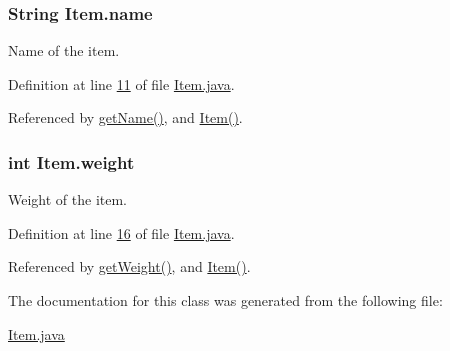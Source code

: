 \hypertarget{classItem_a42fd6d4796fcf652806278f65ce93a3b}{
\subsubsection[{name}]{\setlength{\rightskip}{0pt plus 5cm}String Item.\-name\hspace{0.3cm}{\ttfamily [private]}}}\label{classItem_a42fd6d4796fcf652806278f65ce93a3b}


Name of the item. 



Definition at line \hyperlink{Item_8java_source_l00011}{11} of file \hyperlink{Item_8java_source}{Item.\-java}.



Referenced by \hyperlink{Item_8java_source_l00039}{get\-Name()}, and \hyperlink{Item_8java_source_l00029}{Item()}.

\hypertarget{classItem_ade554833393860faaece5e514637b5d0}{
\subsubsection[{weight}]{\setlength{\rightskip}{0pt plus 5cm}int Item.\-weight\hspace{0.3cm}{\ttfamily [private]}}}\label{classItem_ade554833393860faaece5e514637b5d0}


Weight of the item. 



Definition at line \hyperlink{Item_8java_source_l00016}{16} of file \hyperlink{Item_8java_source}{Item.\-java}.



Referenced by \hyperlink{Item_8java_source_l00047}{get\-Weight()}, and \hyperlink{Item_8java_source_l00029}{Item()}.



The documentation for this class was generated from the following file\-:\begin{DoxyCompactItemize}
\item 
\hyperlink{Item_8java}{Item.\-java}\end{DoxyCompactItemize}
